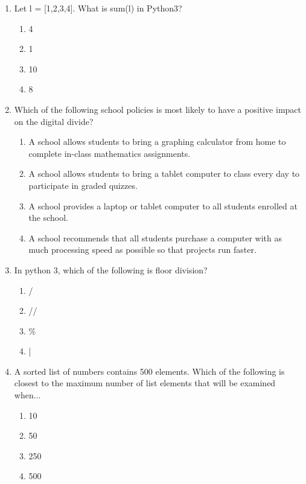 \documentclass[12pt]{article}
\begin{document}
\begin{enumerate}[label=\arabic*.]
\begin{enumerate}[label=(\alph*)]
    \item cmp(list)
    \item len(list)
    \item max(list)
    \item min(list)
\end{enumerate}
\item Let l = [1,2,3,4]. What is sum(l) in Python3?
\begin{enumerate}[label=(\alph*)]
    \item 4
    \item 1
    \item 10
    \item 8
\end{enumerate}
\item Which of the following school policies is most likely to have a positive impact on the digital divide?
\begin{enumerate}[label=(\alph*)]
    \item A school allows students to bring a graphing calculator from home to complete in-class mathematics assignments.
    \item A school allows students to bring a tablet computer to class every day to participate in graded quizzes.
    \item A school provides a laptop or tablet computer to all students enrolled at the school.
    \item A school recommends that all students purchase a computer with as much processing speed as possible so that projects run faster.
\end{enumerate}
\item In python 3, which of the following is floor division?
\begin{enumerate}[label=(\alph*)]
    \item /
    \item //
    \item \%
    \item |
\end{enumerate}
\item A sorted list of numbers contains 500 elements. Which of the following is closest to the maximum number of list elements that will be examined when...
\begin{enumerate}[label=(\alph*)]
    \item 10
    \item 50
    \item 250
    \item 500
\end{enumerate}

\end{enumerate}
\end{document}
